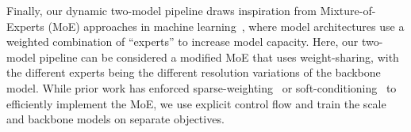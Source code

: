 Finally, our dynamic two-model pipeline draws inspiration from Mixture-of-Experts (MoE) approaches in machine learning~\cite{jacobs1991adaptive, shazeer2017outrageously, yang2019soft, lepikhin2020gshard}, where model architectures use a weighted combination of ``experts'' to increase model capacity.
Here, our two-model pipeline can be considered a modified MoE that uses weight-sharing, with the different experts being the different resolution variations of the backbone model.
While prior work has enforced sparse-weighting~\cite{shazeer2017outrageously} or soft-conditioning~\cite{yang2019soft} to efficiently implement the MoE, we use explicit control flow and train the scale and backbone models on separate objectives.

%
%
%
%
%
%



